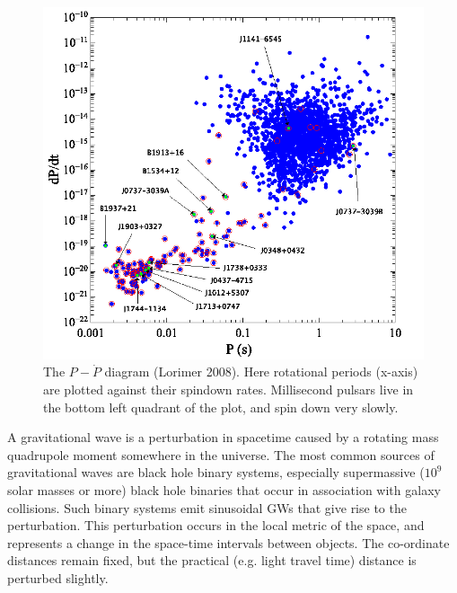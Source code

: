 \documentclass[12pt]{article}
\begin{document}
\begin{figure}
    \caption{The $P-\dot{P}$ diagram (Lorimer 2008). Here rotational periods (x-axis) are
plotted against their spindown rates. Millisecond pulsars live in the bottom
left quadrant of the plot, and spin down very slowly.}
\includegraphics[width=\textwidth]{./figures/fig_P_Pdot_with_names.png}
\end{figure}


A gravitational wave is a perturbation in spacetime caused by a rotating
mass quadrupole moment somewhere in the universe. The most common sources of gravitational
waves are black hole binary systems, especially supermassive ($10^9$ solar
masses or more) black hole binaries
that occur in association with galaxy collisions. Such binary systems emit sinusoidal
GWs that give rise to the perturbation.
This perturbation occurs in the local metric of the space, and represents a
change in the space-time intervals between objects. The co-ordinate distances
remain fixed, but the practical (e.g. light travel time) distance is perturbed
slightly.
\end{document}
